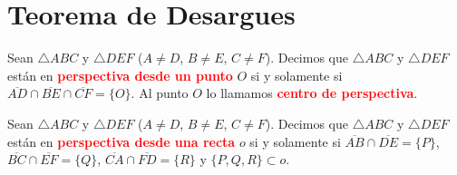 \chapter{Teorema de Desargues}

\begin{df}\label{PDUP} Sean $\triangle ABC$ y $\triangle DEF$ ($A\neq D$, $B\neq E$, $C\neq F$).
Decimos que $\triangle ABC$ y $\triangle DEF$ están en \textcolor{red}{\bf perspectiva desde un punto} $O$ si y solamente si $\overline{AD}\cap\overline{BE}\cap\overline{CF}=\{O\}$. Al punto $O$ lo llamamos \textcolor{red}{\bf centro de perspectiva}.
\end{df}
\begin{df}\label{PDUR} Sean $\triangle ABC$ y $\triangle DEF$ ($A\neq D$, $B\neq E$, $C\neq F$).
Decimos que $\triangle ABC$ y $\triangle DEF$ están en \textcolor{red}{\bf perspectiva desde una recta} $o$ si y solamente si $\overline{AB}\cap\overline{DE}=\{P\}$, $\overline{BC}\cap\overline{EF}=\{Q\}$, $\overline{CA}\cap\overline{FD}=\{R\}$ y $\{P,Q,R\}\subset o$.
\end{df}

